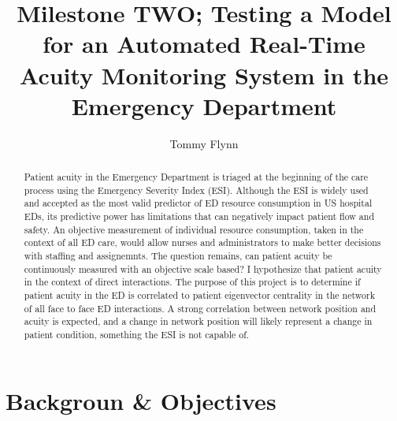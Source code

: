 \documentclass[]{elsarticle} %
\begin{document}
\begin{frontmatter}

  \title{Milestone TWO; Testing a Model for an Automated Real-Time Acuity
Monitoring System in the Emergency Department}
    \author[Emory University]{Tommy Flynn}
      \address[Emory University]{Find the GitHub repository at
\url{https://github.com/tommyflynn/Project-Milestone-1.git}}
  
  \begin{abstract}
  Patient acuity in the Emergency Department is triaged at the beginning
  of the care process using the Emergency Severity Index (ESI). Although
  the ESI is widely used and accepted as the most valid predictor of ED
  resource consumption in US hospital EDs, its predictive power has
  limitations that can negatively impact patient flow and safety. An
  objective measurement of individual resource consumption, taken in the
  context of all ED care, would allow nurses and administrators to make
  better decisions with staffing and assignemnts. The question remains,
  can patient acuity be continuously measured with an objective scale
  based? I hypothesize that patient acuity in the context of direct
  interactions. The purpose of this project is to determine if patient
  acuity in the ED is correlated to patient eigenvector centrality in the
  network of all face to face ED interactions. A strong correlation
  between network position and acuity is expected, and a change in network
  position will likely represent a change in patient condition, something
  the ESI is not capable of.
  \end{abstract}
  
 \end{frontmatter}

\section{Backgroun \& Objectives}\label{backgroun-objectives}
\end{document}
